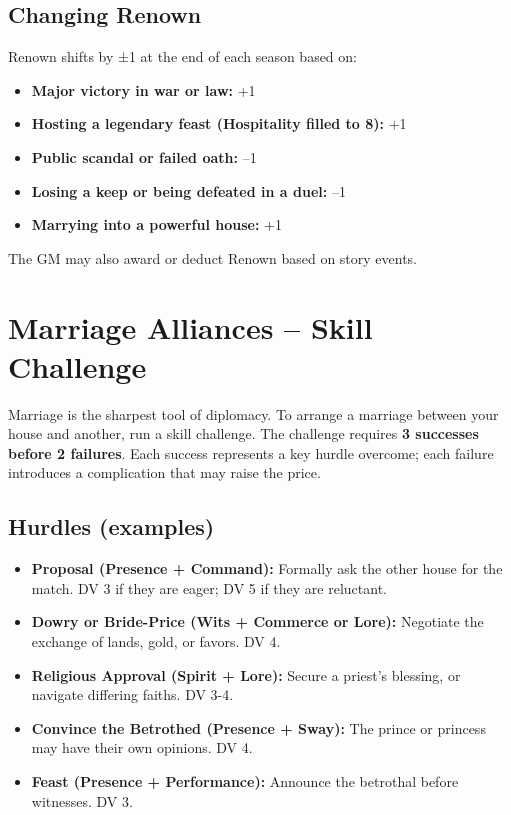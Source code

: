 \documentclass[11pt]{article}
\begin{document}
\subsection*{Changing Renown}
Renown shifts by ±1 at the end of each season based on:

\begin{itemize}
    \item \textbf{Major victory in war or law:} +1
    \item \textbf{Hosting a legendary feast (Hospitality filled to 8):} +1
    \item \textbf{Public scandal or failed oath:} --1
    \item \textbf{Losing a keep or being defeated in a duel:} --1
    \item \textbf{Marrying into a powerful house:} +1
\end{itemize}

The GM may also award or deduct Renown based on story events.

\section{Marriage Alliances -- Skill Challenge}

Marriage is the sharpest tool of diplomacy. To arrange a marriage between your house and another, run a skill challenge. The challenge requires \textbf{3 successes before 2 failures}. Each success represents a key hurdle overcome; each failure introduces a complication that may raise the price.

\subsection*{Hurdles (examples)}
\begin{itemize}
    \item \textbf{Proposal (Presence + Command):} Formally ask the other house for the match. DV 3 if they are eager; DV 5 if they are reluctant.
    \item \textbf{Dowry or Bride-Price (Wits + Commerce or Lore):} Negotiate the exchange of lands, gold, or favors. DV 4.
    \item \textbf{Religious Approval (Spirit + Lore):} Secure a priest's blessing, or navigate differing faiths. DV 3-4.
    \item \textbf{Convince the Betrothed (Presence + Sway):} The prince or princess may have their own opinions. DV 4.
    \item \textbf{Feast (Presence + Performance):} Announce the betrothal before witnesses. DV 3.
\end{itemize}
\end{document}
